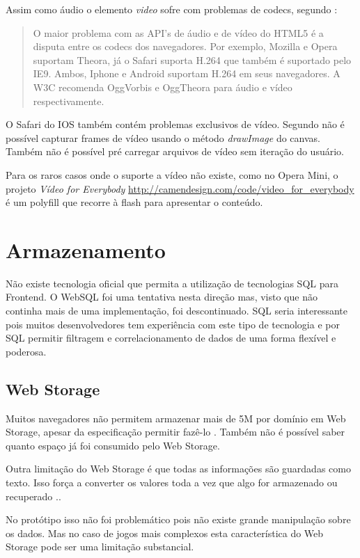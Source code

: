 Assim como áudio o elemento \textit{video} sofre com problemas de
codecs, segundo \cite{html5Tradeoffs}:
\begin{quote}
O maior problema com as API's de áudio e de vídeo do HTML5 é
a disputa entre os codecs dos navegadores. Por exemplo, Mozilla e
Opera suportam Theora, já o Safari suporta H.264 que também é
suportado pelo IE9. Ambos, Iphone e Android suportam H.264 em seus
navegadores. A W3C recomenda OggVorbis e OggTheora para áudio e vídeo
respectivamente.
\end{quote}

O Safari do IOS também contém problemas exclusivos de vídeo. Segundo
\cite{unsolvedMediaHtmlIssues} não é possível capturar frames de
vídeo usando o método \textit{drawImage} do canvas. Também não é
possível pré carregar arquivos de vídeo sem iteração do usuário.

Para os raros casos onde o suporte a vídeo não existe,
como no Opera Mini, o projeto \textit{Vídeo for Everybody}
\url{http://camendesign.com/code/video_for_everybody} é um polyfill que
recorre à flash para apresentar o conteúdo.

\section{Armazenamento}

Não existe tecnologia oficial que permita a utilização de tecnologias
SQL para Frontend. O WebSQL foi uma tentativa nesta direção mas, visto
que não continha mais de uma implementação, foi descontinuado. SQL
seria interessante pois muitos desenvolvedores tem experiência com este
tipo de tecnologia e por SQL permitir filtragem e correlacionamento de
dados de uma forma flexível e poderosa.

\subsection{Web Storage}

Muitos navegadores não permitem armazenar mais de 5M por domínio
em Web Storage, apesar da especificação permitir fazê-lo
\autocite{gameAssetManagement}. Também não é possível saber
quanto espaço já foi consumido pelo Web Storage.

Outra limitação do Web Storage é que todas as informações são
guardadas como texto. Isso força a converter os valores toda a vez que
algo for armazenado ou recuperado \autocite{gameAssetManagement}..

No protótipo isso não foi problemático pois não existe grande
manipulação sobre os dados. Mas no caso de jogos mais complexos esta
característica do Web Storage pode ser uma limitação substancial.

